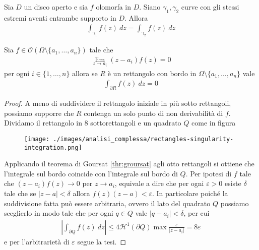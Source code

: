 \begin{corollary}
	Sia $D$ un disco aperto e sia $f$ olomorfa in $D$. Siano $\gamma_1, \gamma_2$ curve con gli stessi estremi aventi entrambe supporto in $D$. Allora
	\begin{equation*}
	\begin{aligned}	
	\int_{\gamma_1} f(z) \ dz = \int_{\gamma_2} f(z) \ dz
	\end{aligned}
	\end{equation*}
\end{corollary}

\begin{theorem}
	\label{thr:goursat-con-singolarità}
	Sia $f \in \mathcal{O}(\Omega \setminus \{a_1, \dots, a_n\})$ tale che
	\begin{equation*}
	\begin{aligned}
	\lim_{z\to a_i} (z-a_i)f(z) = 0
	\end{aligned}
	\end{equation*}
	per ogni $i \in \{1, \dots, n\}$ allora se $R$ è un rettangolo con bordo in $\Omega \setminus  \{a_1, \dots, a_n\}$ vale
	\begin{equation*}
	\begin{aligned}
	\int_{\partial R} f(z)\ dz = 0
	\end{aligned}
	\end{equation*}
\end{theorem}
\begin{proof}
	A meno di suddividere il rettangolo iniziale in più sotto rettangoli, possiamo supporre che $R$ contenga un solo punto di non derivabilità di $f$. Dividamo il rettangolo in $8$ sottorettangoli e un quadrato $Q$ come in figura
	\begin{figure}[h]
		\centering
		\texttt{[image: ./images/analisi\_complessa/rectangles-singularity-integration.png]}
		\caption{}
		\label{fig:rectangles-singularity-integration}
	\end{figure}
	Applicando il teorema di Goursat \ref{thr:groursat} agli otto rettangoli si ottiene che l'integrale sul bordo coincide con l'integrale sul bordo di $Q$. 
	Per ipotesi di $f$ tale che $(z-a_i)f(z) \to 0$ per $z \to a_i$, equivale a dire che per ogni $\varepsilon > 0$ esiste $\delta$ tale che se $|z - a| < \delta$ allora $f(z)(z-a) < \varepsilon$. In particolare poiché la suddivisione fatta può essere arbitraria, ovvero il lato del quadrato $Q$ possiamo sceglierlo in modo tale che per ogni $q\in Q$ vale $|q-a_i| < \delta$, per cui
	\begin{equation*}
	\begin{aligned}
	\left|\int_{\partial Q} f(z)\ dz\right| \le 4 \mathcal{H}^1(\partial Q) \max \frac{\varepsilon }{|z-a_i|} = 8\varepsilon 
	\end{aligned}
	\end{equation*}
	e per l'arbitrarietà di $\varepsilon$ segue la tesi.
\end{proof}

